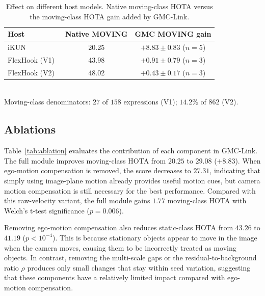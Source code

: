 \documentclass[sigconf,anonymous,nonacm]{acmart}
\begin{document}
\begin{table}[t]
\centering
\caption{Effect on different host models. Native moving-class HOTA versus the moving-class HOTA gain added by GMC-Link.}
\label{tab:deficit}
\small
\begin{tabular}{lcc}
\toprule
Host & Native MOVING & GMC MOVING gain \\
\midrule
iKUN~\cite{ikun}             & 20.25 & $+8.83 \pm 0.83$ ($n{=}5$) \\
FlexHook (V1)~\cite{flexhook}  & 43.98 & $+0.91 \pm 0.79$ ($n{=}3$) \\
FlexHook (V2)~\cite{flexhook}  & 48.02 & $+0.43 \pm 0.17$ ($n{=}3$) \\
\bottomrule
\end{tabular}
\\[2pt]
{\footnotesize Moving-class denominators: $27$ of $158$ expressions (V1); $14.2\%$ of $862$ (V2).}
\end{table}

\subsection{Ablations}
\label{sec:ablation}

Table~\ref{tab:ablation} evaluates the contribution of each component in GMC-Link. The full module improves moving-class HOTA from $20.25$ to $29.08$ ($+8.83$). When ego-motion compensation is removed, the score decreases to $27.31$, indicating that simply using image-plane motion already provides useful motion cues, but camera motion compensation is still necessary for the best performance. Compared with this raw-velocity variant, the full module gains $1.77$ moving-class HOTA with Welch's t-test significance ($p{=}0.006$).

Removing ego-motion compensation also reduces static-class HOTA from $43.26$ to $41.19$ ($p{<}10^{-4}$). This is because stationary objects appear to move in the image when the camera moves, causing them to be incorrectly treated as moving objects. In contrast, removing the multi-scale gaps or the residual-to-background ratio $\rho$ produces only small changes that stay within seed variation, suggesting that these components have a relatively limited impact compared with ego-motion compensation.
\end{document}

